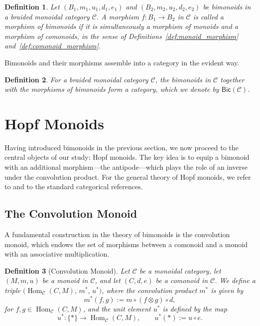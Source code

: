 \documentclass{amsart}
\newtheorem{definition}{Definition}[section]
\begin{document}
\begin{definition}\label{def:bimonoid_morphism}
Let $(B_1, m_1, u_1, d_1, e_1)$ and $(B_2, m_2, u_2, d_2, e_2)$ be bimonoids in a braided monoidal category $\mathcal{C}$. A morphism $f \colon B_1 \longrightarrow B_2$ in $\mathcal{C}$ is called a morphism of bimonoids if it is simultaneously a morphism of monoids and a morphism of comonoids, in the sense of Definitions~\ref{def:monoid_morphism} and~\ref{def:comonoid_morphism}.
\end{definition}

Bimonoids and their morphisms assemble into a category in the evident way.

\begin{definition}\label{def:bic_category}
For a braided monoidal category $\mathcal{C}$, the bimonoids in $\mathcal{C}$ together with the morphisms of bimonoids form a category, which we denote by $\mathsf{Bic}(\mathcal{C})$.
\end{definition}
\section{Hopf Monoids}\label{sec:hopf_monoids_final}

Having introduced bimonoids in the previous section, we now proceed to the central objects of our study: Hopf monoids. The key idea is to equip a bimonoid with an additional morphism—the antipode—which plays the role of an inverse under the convolution product. For the general theory of Hopf monoids, we refer to \cite{FT} and to the standard categorical references.

\subsection{The Convolution Monoid}

A fundamental construction in the theory of bimonoids is the convolution monoid, which endows the set of morphisms between a comonoid and a monoid with an associative multiplication.

\begin{definition}[Convolution Monoid]\label{def:convolution}
Let $\mathcal{C}$ be a monoidal category, let $(M, m, u)$ be a monoid in $\mathcal{C}$, and let $(C, d, e)$ be a comonoid in $\mathcal{C}$. We define a triple $\bigl(\operatorname{Hom}_{\mathcal{C}}(C, M), \, m^*, \, u^*\bigr)$, where the convolution product $m^*$ is given by
\[
m^*(f, g) := m \circ (f \otimes g) \circ d,
\]
for $f, g \in \operatorname{Hom}_{\mathcal{C}}(C, M)$, and the unit element $u^*$ is defined by the map
\[
u^* \colon \{*\} \longrightarrow \operatorname{Hom}_{\mathcal{C}}(C, M), \qquad u^*(*) := u \circ e.
\]
\end{definition}
\end{document}
